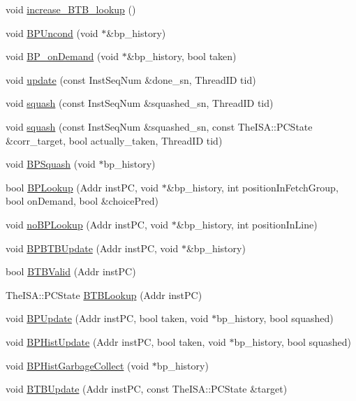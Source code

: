 \begin{DoxyCompactItemize}
\item 
void \hyperlink{classBPredUnit_a41ecb08c99f45538eaf1de4e184905b4}{increase\_\-BTB\_\-lookup} ()
\item 
void \hyperlink{classBPredUnit_a24bfe00e5e8c2a318930a6474ed60173}{BPUncond} (void $\ast$\&bp\_\-history)
\item 
void \hyperlink{classBPredUnit_a282f0c689c4cedfb52221c1ce96b4084}{BP\_\-onDemand} (void $\ast$\&bp\_\-history, bool taken)
\item 
void \hyperlink{classBPredUnit_aa154b29fbf52ad49d89a046e94b53ac9}{update} (const InstSeqNum \&done\_\-sn, ThreadID tid)
\item 
void \hyperlink{classBPredUnit_a94a04b4bdf8f6b9b3cf33882bc16067b}{squash} (const InstSeqNum \&squashed\_\-sn, ThreadID tid)
\item 
void \hyperlink{classBPredUnit_a78e6f48f8a11db90daab850527d48aa7}{squash} (const InstSeqNum \&squashed\_\-sn, const TheISA::PCState \&corr\_\-target, bool actually\_\-taken, ThreadID tid)
\item 
void \hyperlink{classBPredUnit_a14a43c5f5bc8c64c07a075ce1608f9c3}{BPSquash} (void $\ast$bp\_\-history)
\item 
bool \hyperlink{classBPredUnit_aafefe8c8d85f49d118e825fa0c1c0176}{BPLookup} (Addr instPC, void $\ast$\&bp\_\-history, int positionInFetchGroup, bool onDemand, bool \&choicePred)
\item 
void \hyperlink{classBPredUnit_af5b3e6db0cf1f00dee290e16765f28f8}{noBPLookup} (Addr instPC, void $\ast$\&bp\_\-history, int positionInLine)
\item 
void \hyperlink{classBPredUnit_a55a6608f958c4e70360c34bd48c57032}{BPBTBUpdate} (Addr instPC, void $\ast$\&bp\_\-history)
\item 
bool \hyperlink{classBPredUnit_a66a1f6f9cdd28b38b005a666a9976ed7}{BTBValid} (Addr instPC)
\item 
TheISA::PCState \hyperlink{classBPredUnit_a31024f2d92bfd7e778a790f4c6f61498}{BTBLookup} (Addr instPC)
\item 
void \hyperlink{classBPredUnit_a35c57ae0661f1d5dd2169e919741d47b}{BPUpdate} (Addr instPC, bool taken, void $\ast$bp\_\-history, bool squashed)
\item 
void \hyperlink{classBPredUnit_a16de9793a28ee07dcf26d89c03328555}{BPHistUpdate} (Addr instPC, bool taken, void $\ast$bp\_\-history, bool squashed)
\item 
void \hyperlink{classBPredUnit_a9268abcbddfdfd6e6a076ecd343a3de5}{BPHistGarbageCollect} (void $\ast$bp\_\-history)
\item 
void \hyperlink{classBPredUnit_a5afe025cde23c608d745e8daca63e8a6}{BTBUpdate} (Addr instPC, const TheISA::PCState \&target)
\end{DoxyCompactItemize}


